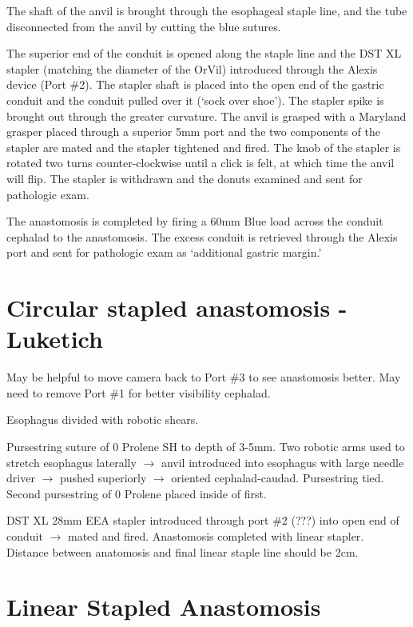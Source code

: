 \documentclass[
  letterpaper,
]{scrbook}
\begin{document}
The shaft of the anvil is brought through the esophageal staple line,
and the tube disconnected from the anvil by cutting the blue sutures.

The superior end of the conduit is opened along the staple line and the
DST XL stapler (matching the diameter of the OrVil) introduced through
the Alexis device (Port \#2). The stapler shaft is placed into the open
end of the gastric conduit and the conduit pulled over it (`sock over
shoe'). The stapler spike is brought out through the greater curvature.
The anvil is grasped with a Maryland grasper placed through a superior
5mm port and the two components of the stapler are mated and the stapler
tightened and fired. The knob of the stapler is rotated two turns
counter-clockwise until a click is felt, at which time the anvil will
flip. The stapler is withdrawn and the donuts examined and sent for
pathologic exam.

The anastomosis is completed by firing a 60mm Blue load across the
conduit cephalad to the anastomosis. The excess conduit is retrieved
through the Alexis port and sent for pathologic exam as `additional
gastric margin.'

\section{Circular stapled anastomosis -
Luketich}\label{circular-stapled-anastomosis---luketich}

May be helpful to move camera back to Port \#3 to see anastomosis
better. May need to remove Port \#1 for better visibility cephalad.

Esophagus divided with robotic shears.

Pursestring suture of 0 Prolene SH to depth of 3-5mm. Two robotic arms
used to stretch esophagus laterally \(\rightarrow\) anvil introduced
into esophagus with large needle driver \(\rightarrow\) pushed
superiorly \(\rightarrow\) oriented cephalad-caudad. Pursestring tied.
Second pursestring of 0 Prolene placed inside of first.

DST XL 28mm EEA stapler introduced through port \#2 (???) into open end
of conduit \(\rightarrow\) mated and fired. Anastomosis completed with
linear stapler. Distance between anatomosis and final linear staple line
should be 2cm.

\section{Linear Stapled Anastomosis}\label{linear-stapled-anastomosis}
\end{document}
